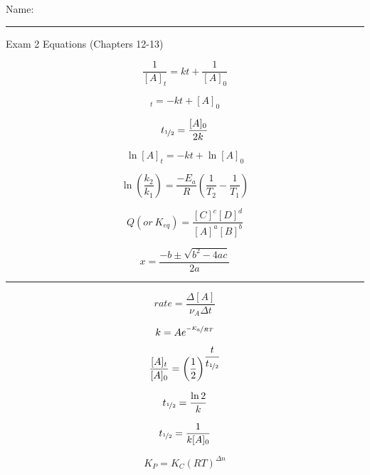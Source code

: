 \documentclass[11pt, letterpaper]{memoir}
\begin{document}
  {\large Name: \rule[-1mm]{4in}{.1pt}}

	\begin{center}
		{\large Exam 2 Equations (Chapters 12-13)}
	\end{center}

  \begin{minipage}[c][\stretch{1}][c]{0.46\linewidth}
    \begin{equation*}
      \dfrac{1}{[A]_t} = kt + \dfrac{1}{[A]_0}
    \end{equation*}

    \begin{equation*}
      [A]_t=-kt+[A]_0
    \end{equation*}

    \begin{equation*}
      t_{\nicefrac{1}{2}} = \dfrac{[A]_0}{2k}
    \end{equation*}

    \begin{equation*}
      \ln[A]_t=-kt+\ln[A]_0
    \end{equation*}

    \begin{equation*}
      \ln\left(\dfrac{k_2}{k_1}\right)=\dfrac{-E_a}{R}\left(\dfrac{1}{T_2}-\dfrac{1}{T_1}\right)
    \end{equation*}

    \begin{equation*}
      Q \left(or~K_{eq}\right) = \dfrac{[C]^c[D]^d}{[A]^a[B]^b}
    \end{equation*}

    \begin{equation*}
      x=\dfrac{-b\pm\sqrt{b^2-4ac}}{2a}
    \end{equation*}
  \end{minipage}
  \rule[-400pt]{1.5pt}{600pt}
  \begin{minipage}[c][\stretch{1}][c]{0.5\linewidth}
    \begin{equation*}
      rate=\dfrac{\Delta[A]}{\nu_A\Delta t}
    \end{equation*}

    \begin{equation*}
      k=Ae^{\nicefrac{-E_a}{RT}}
    \end{equation*}

    \begin{equation*}
      \dfrac{[A]_t}{[A]_0}=\left(\dfrac{1}{2}\right)^{\dfrac{t}{t_{\nicefrac{1}{2}}}}
    \end{equation*}

    \begin{equation*}
      t_{\nicefrac{1}{2}}=\dfrac{\ln{2}}{k}
    \end{equation*}

    \begin{equation*}
      t_{\nicefrac{1}{2}} = \dfrac{1}{k[A]_0}
    \end{equation*}

    \begin{equation*}
      K_P=K_C\left(RT\right)^{\Delta n}
    \end{equation*}
  \end{minipage}
\end{document}
